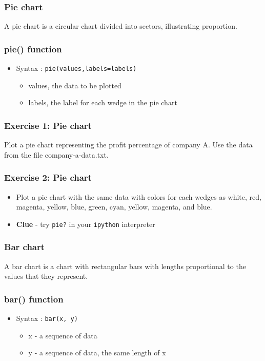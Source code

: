 \documentclass[17pt]{beamer}
\begin{document}
\begin{frame}
\frametitle{Pie chart}
A pie chart is a circular chart divided into sectors, illustrating proportion.
\end{frame}
\begin{frame}[fragile]
\frametitle{pie() function}
\begin{itemize}
\item Syntax : \texttt{pie(values,labels=labels)}\pause
\begin{itemize}
\item values, the data to be plotted\pause
\item labels, the label for each wedge in the pie chart
\end{itemize}
\end{itemize}
\end{frame}
\begin{frame}[fragile]
\frametitle{Exercise 1: Pie chart}
Plot a pie chart representing the profit percentage of company A. Use the data from the file company-a-data.txt.
\end{frame}
\begin{frame}[fragile]
\frametitle{Exercise 2: Pie chart}
\begin{itemize}
\item Plot a pie chart with the same data with colors for each wedges as white, red,
magenta, yellow, blue, green, cyan, yellow, magenta, and blue.\pause
\item \textbf{Clue} - try \texttt{pie?} in your \texttt{ipython} interpreter
\end{itemize}
\end{frame}
\begin{frame}
\frametitle{Bar chart}
A bar chart is a chart with rectangular bars with lengths proportional to the values that they represent.
\end{frame}
\begin{frame}[fragile]
\frametitle{bar() function}
\begin{itemize}
\item Syntax : \texttt{bar(x, y)}\pause
\begin{itemize}
\item x - a sequence of data\pause
\item y - a sequence of data, the same length of x
\end{itemize}
\end{itemize}
\end{frame}
\end{document}
